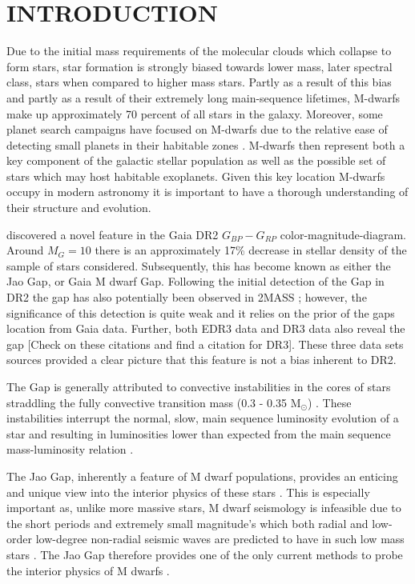 \section{INTRODUCTION}\label{sec:intro}
Due to the initial mass requirements of the molecular clouds which collapse to form
stars, star formation is strongly biased towards lower mass, later spectral
class, stars when compared to higher mass stars. Partly as a result of this
bias and partly as a result of their extremely long main-sequence lifetimes,
M-dwarfs make up approximately 70 percent of all stars in the galaxy. Moreover,
some planet search campaigns have focused on M-dwarfs due to the relative ease
of detecting small planets in their habitable zones \citep[e.g.][]{Nut08}.
M-dwarfs then represent both a key component of the galactic stellar population
as well as the possible set of stars which may host habitable exoplanets.
Given this key location M-dwarfs occupy in modern astronomy it is important to
have a thorough understanding of their structure and evolution.

\citet{Jao2018} discovered a novel feature in the Gaia DR2 $G_{BP}-G_{RP}$
color-magnitude-diagram. Around $M_{G}=10$ there is an approximately 17\%
decrease in stellar density of the sample of stars \citeauthor{Jao2018}
considered. Subsequently, this has become known as either the Jao Gap, or Gaia
M dwarf Gap. Following the initial detection of the Gap in DR2 the gap has also
potentially been observed in 2MASS \citep{Skrutskie2006, Jao2018}; however, the
significance of this detection is quite weak and it relies on the prior of the gaps
location from Gaia data. Further, both EDR3 data and DR3 data also reveal the
gap \citep{Jao2020} {\color{red} [Check on these citations and find a citation
for DR3]}. These three data sets sources provided a clear picture that this
feature is not a bias inherent to DR2.

The Gap is generally attributed to convective instabilities in the cores of
stars straddling the fully convective transition mass (0.3 - 0.35 M$_{\odot}$)
\citep{Baraffe2018}. These instabilities interrupt the normal, slow, main
sequence luminosity evolution of a star and resulting in luminosities lower
than expected from the main sequence mass-luminosity relation \citep{Jao2020}.

The Jao Gap, inherently a feature of M dwarf populations, provides an enticing
and unique view into the interior physics of these stars \citep{Feiden2021}.
This is especially important as, unlike more massive stars, M dwarf seismology
is infeasible due to the short periods and extremely small
magnitude's which both radial and low-order low-degree non-radial seismic waves
are predicted to have in such low mass stars \citep{Rodriguez-Lopez2019}. The
Jao Gap therefore provides one of the only current methods to probe the
interior physics of M dwarfs \citep[e.g][{\color{red}[ARE THESE THE BEST PAPERS
TO CITE HERE?]}]{Feiden2021, Mansfield2021}.

